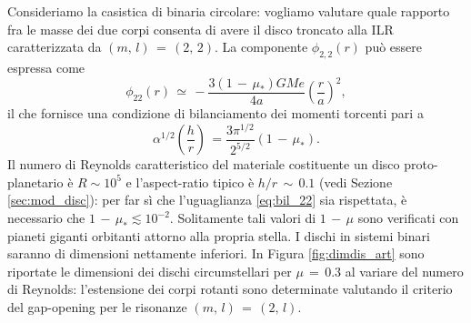 Consideriamo la casistica di binaria circolare: vogliamo valutare quale rapporto fra le masse dei due corpi consenta di avere il disco troncato alla ILR caratterizzata da $(m,\,l)\,=\,(2,\,2)$. La componente $\phi_{2,2}(r)$ può essere espressa \parencite{ArtymowiczLubow1994} come
\begin{equation}
\phi_{22}(r)\,\simeq\,-\frac{3(1\,-\,\mu_\ast)GMe}{4a}\left(\frac{r}{a}\right)^2,
\label{eq:pot_22_bin}
\end{equation}
il che fornisce una condizione di bilanciamento dei momenti torcenti pari a
\begin{equation}
\alpha^{1/2}\left(\frac{h}{r}\right)\,=\frac{3\pi^{1/2}}{2^{5/2}}(1\,-\,\mu_\ast).
\label{eq:bil_22}
\end{equation}
Il numero di Reynolds caratteristico del materiale costituente un disco proto-planetario è $R \sim 10^{5}$ e l'aspect-ratio tipico è $h/r\,\sim\,0.1$ (vedi Sezione \ref{sec:mod_disc}): per far sì che l'uguaglianza \eqref{eq:bil_22} sia rispettata, è necessario che $1\,-\,\mu_\ast \lesssim 10^{-2}$.
Solitamente tali valori di $1\,-\,\mu$ sono verificati con pianeti giganti orbitanti attorno alla propria stella. I dischi in sistemi binari saranno di dimensioni nettamente inferiori. In Figura \ref{fig:dimdis_art} sono riportate le dimensioni dei dischi circumstellari per $\mu\,=\,0.3$ al variare del numero di Reynolds: l'estensione dei corpi rotanti sono determinate valutando il criterio del gap-opening per le risonanze $(m,\,l)\,=\,(2,\,l)$.
